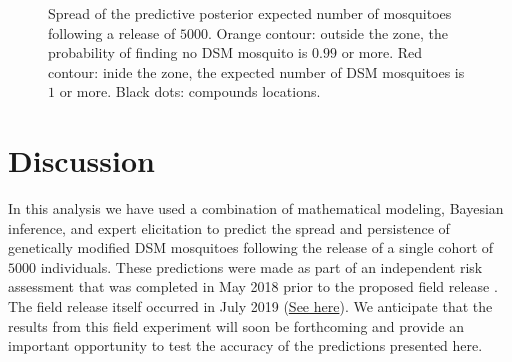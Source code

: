 \documentclass[]{bmcart}
\begin{document}
\begin{figure}[t]
\caption[Spread of the expected number of mosquitoes following a release of $5000$. Orange contour: outside the zone, the probablity of finding no DSM mosquito is $0.99$ or more. Red contour: inide the range, the expected number of DSM mosquito is $1$ or more.]{Spread of the predictive posterior expected number of mosquitoes following a release of $5000$. Orange contour: outside the zone, the probability of finding no DSM mosquito is $0.99$ or more. Red contour: inide the zone, the expected number of DSM mosquitoes is $1$ or more. Black dots: compounds locations.}\label{fig:plotSpread}
\end{figure}

\section{Discussion}
In this analysis we have used a combination of mathematical modeling, Bayesian inference, and expert elicitation to predict the spread and persistence of genetically modified DSM mosquitoes following the release of a single cohort of $5000$ individuals. These predictions were made as part of an independent risk assessment that was completed in May 2018 prior to the proposed field release \citep{Hayes2015a, Hayes2018}. The field release itself occurred in July 2019 (\href{https://tinyurl.com/y4qr9lc5}{See here}). We anticipate that the results from this field experiment will soon be forthcoming and provide an important opportunity to test the accuracy of the predictions presented here.
\end{document}
